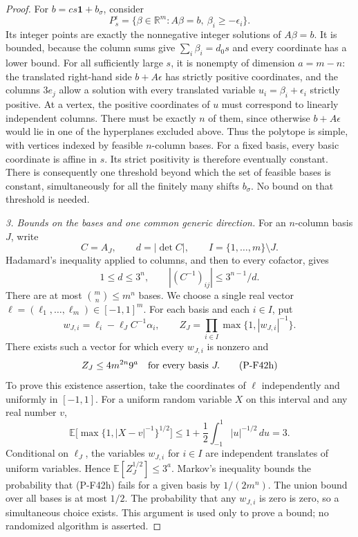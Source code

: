 \begin{proof}
For $b=cs\mathbf1+b_\sigma$, consider
\[
 P_s^\epsilon=
 \{\beta\in\mathbb R^m:A\beta=b,\ \beta_i\ge-\epsilon_i\}.
 \tag{P-F42e}
\]
Its integer points are exactly the nonnegative integer solutions
of $A\beta=b$. It is bounded, because the column sums give
$\sum_i\beta_i=d_0s$ and every coordinate has a lower bound.
For all sufficiently large $s$, it is nonempty of dimension
$a=m-n$: the translated right-hand side $b+A\epsilon$ has
strictly positive coordinates, and the columns $3e_j$ allow a
solution with every translated variable $u_i=\beta_i+\epsilon_i$
strictly positive.
At a vertex, the positive coordinates of $u$ must correspond
to linearly independent columns. There must be exactly $n$ of
them, since otherwise $b+A\epsilon$ would lie in one of the
hyperplanes excluded above. Thus the polytope is simple, with
vertices indexed by feasible $n$-column bases.
For a fixed basis, every basic coordinate is affine in $s$.
Its strict positivity is therefore eventually constant.
There is consequently one threshold beyond which the set of
feasible bases is constant, simultaneously for all the finitely
many shifts $b_\sigma$. No bound on that threshold is needed.

\emph{3. Bounds on the bases and one common generic direction.}
For an $n$-column basis $J$, write
\[
 C=A_J,\qquad d=|\det C|,\qquad I=\{1,\ldots,m\}\setminus J.
\]
Hadamard's inequality applied to columns, and then to every
cofactor, gives
\[
 1\le d\le3^n,\qquad
 |(C^{-1})_{ij}|\le 3^{n-1}/d.
 \tag{P-F42f}
\]
There are at most $\binom mn\le m^n$ bases.
We choose a single real vector
$\ell=(\ell_1,\ldots,\ell_m)\in[-1,1]^m$.
For each basis and each $i\in I$, put
\[
 w_{J,i}=\ell_i-\ell_J C^{-1}\alpha_i,\qquad
 Z_J=\prod_{i\in I}\max\{1,|w_{J,i}|^{-1}\}.
 \tag{P-F42g}
\]
There exists such a vector for which every $w_{J,i}$ is nonzero
and
\[
                 Z_J\le4m^{2n}9^a
                         \quad\hbox{for every basis }J.
 \tag{P-F42h}
\]
To prove this existence assertion, take the coordinates of
$\ell$ independently and uniformly in $[-1,1]$.
For a uniform random variable $X$ on this interval and any real
number $v$,
\[
 \mathbb E\bigl[\max\{1,|X-v|^{-1}\}^{1/2}\bigr]
 \le1+\frac12\int_{-1}^{1}|u|^{-1/2}\,du=3.
 \tag{P-F42i}
\]
Conditional on $\ell_J$, the variables $w_{J,i}$ for $i\in I$
are independent translates of uniform variables. Hence
$\mathbb E[Z_J^{1/2}]\le3^a$.
Markov's inequality bounds the probability that (P-F42h) fails
for a given basis by $1/(2m^n)$. The union bound over all bases
is at most $1/2$. The probability that any $w_{J,i}$ is zero is
zero, so a simultaneous choice exists. This argument is used
only to prove a bound; no randomized algorithm is asserted.


\end{proof}
